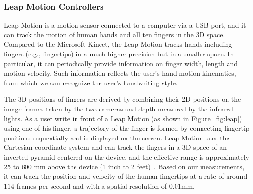 




\subsubsection{Leap Motion Controllers}

Leap Motion is a motion sensor connected to a computer via a USB port, and it can track the motion of human hands and all ten fingers in the 3D space. Compared to the Microsoft Kinect, the Leap Motion tracks hands including fingers (e.g., fingertips) in a much higher precision but in a smaller space. 
In particular, it can periodically provide
information on finger width, length and motion velocity.   
Such information reflects the user's hand-motion kinematics, from which we can 
recognize the user's handwriting style.

 The 3D positions of fingers are derived by combining their 2D positions on the image frames taken by the two cameras and depth measured by the infrared lights. 
As a user write in front of a Leap Motion (as shown in Figure~\ref{fig:leap}) using one of his finger, %
a trajectory of the finger is formed by connecting fingertip positions sequentially and is displayed on the screen.
Leap Motion uses the Cartesian coordinate system and can track the fingers in a 3D space of an inverted pyramid centered on the device, and the effective range is approximately 25 to 600 mm above the device (1 inch to 2 feet)~\cite{LeapOnlineOverview,leapBlog}.
Based on our measurements, it can track the position and velocity of the human fingertips at a rate of around $114$ frames per second and with a spatial resolution of $0.01$mm.

